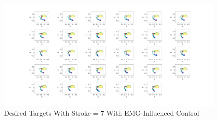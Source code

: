 \newpage
\begin{landscape} %
  \begin{figure}[h!]
    \centering
    \includegraphics[width=1.9\textwidth]{Pictures/Results/Controller/Stroke29positions.png}
    \caption{Desired Targets With Stroke = 7 With EMG-Influenced Control} 
  \end{figure}
\end{landscape} %